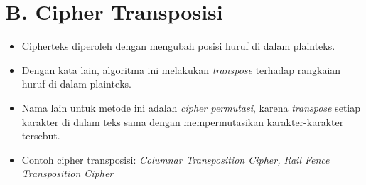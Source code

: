 \documentclass{article}
\begin{document}

\section*{B. Cipher Transposisi}

\begin{itemize}
    \item Cipherteks diperoleh dengan mengubah posisi huruf di dalam plainteks.
    \item Dengan kata lain, algoritma ini melakukan \textit{transpose} terhadap rangkaian huruf di dalam plainteks.
    \item Nama lain untuk metode ini adalah \textit{cipher permutasi}, karena \textit{transpose} setiap karakter di dalam teks sama dengan mempermutasikan karakter-karakter tersebut.
    \item Contoh cipher transposisi: \textit{Columnar Transposition Cipher, Rail Fence Transposition Cipher}
\end{itemize}
\end{document}
